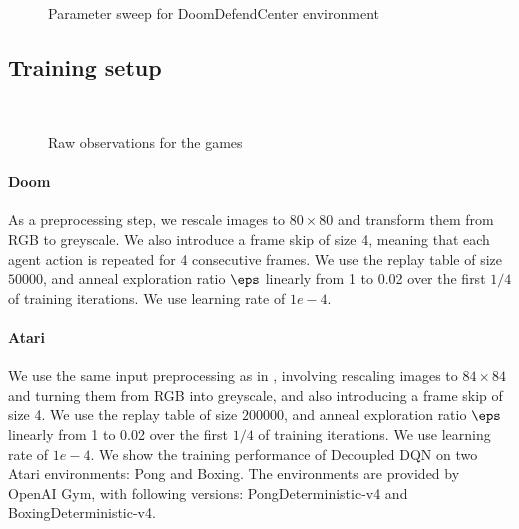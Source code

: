 \begin{figure*}[h!]
\\
\caption{Parameter sweep for DoomDefendCenter environment}
\label{fig:doom_sweep}
\end{figure*}

\subsection{Training setup}

\begin{figure*}[t]
\hspace{1.5cm}
\\
\caption{Raw observations for the games}
\label{fig:game_frames}
\end{figure*}

\paragraph{Doom}
As a preprocessing step, we rescale images to $80 \times 80$ and transform them from RGB to greyscale.
We also introduce a frame skip of size 4, meaning that each agent action is repeated for 4 consecutive frames.
We use the replay table of size $50000$, and anneal exploration ratio $\eps$ linearly from 1 to 0.02
over the first $1/4$ of training iterations. We use learning rate of $1e-4$.

\paragraph{Atari}
We use the same input preprocessing as in \cite{mnih-dqn-2015}, involving rescaling images to $84
\times 84$ and turning them from RGB into greyscale, and also introducing a frame skip of size 4.
We use the replay table of size $200000$, and anneal exploration ratio $\eps$ linearly from 1 to 0.02
over the first $1/4$ of training iterations. We use learning rate of $1e-4$.
We show the training performance of Decoupled DQN on two Atari environments: Pong and Boxing.
The environments are provided by OpenAI Gym, with following versions: PongDeterministic-v4 and
BoxingDeterministic-v4.

